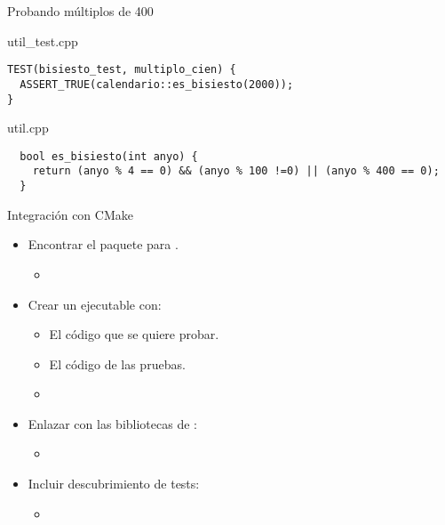 \begin{frame}[t,fragile]{Probando múltiplos de 400}
\begin{block}{util\_test.cpp}
\begin{lstlisting}
TEST(bisiesto_test, multiplo_cien) {
  ASSERT_TRUE(calendario::es_bisiesto(2000));
}
\end{lstlisting}
\end{block}

\begin{block}{util.cpp}
\begin{lstlisting}
  bool es_bisiesto(int anyo) {
    return (anyo % 4 == 0) && (anyo % 100 !=0) || (anyo % 400 == 0);
  }
\end{lstlisting}
\end{block}

\end{frame}

\begin{frame}[t,fragile]{Integración con CMake}
\begin{itemize}
  \item Encontrar el paquete  para .
    \begin{itemize}
      \item {}
    \end{itemize}

  \item Crear un ejecutable con:
    \begin{itemize}
      \item El código que se quiere probar.
      \item El código de las pruebas.
      \item {}
    \end{itemize}

  \item Enlazar con las bibliotecas de :
    \begin{itemize}
      \item {}
    \end{itemize}

  \item Incluir descubrimiento de tests:
    \begin{itemize}
      \item {}
    \end{itemize}
\end{itemize}
\end{frame}

